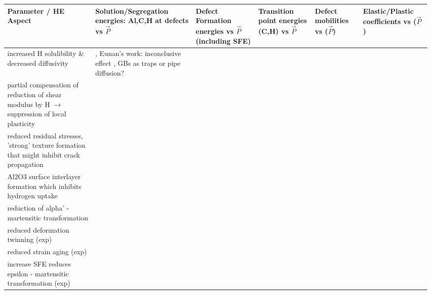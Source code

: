\documentclass[11pt,floatfix,showpacs]{amsart}
\begin{document}
\begin{landscape}
\renewcommand{\arraystretch}{2}

  \begin{tabular}{ ||p{5 cm}|  p{3.3 cm}| p{3 cm}| p{2.5 cm} | p{2.5 cm} | p{3.0 cm} || } %
    \hline
    Parameter / HE Aspect &  Solution/Segregation energies: Al,C,H at defects vs $\vec{P}$ & Defect Formation energies vs $\vec{P} $(including SFE)  & Transition point energies (C,H) vs $\vec{P}$ & Defect mobilities vs ($\vec{P}$) & Elastic/Plastic coefficients vs ($\vec{P}$) \\ \hline
    increased H solulibility \& decreased diffusivity & \cite{song2014interaction,han2015effect,huter2016effects}, {\color{green}Eunan's work: inconclusive effect} {\color{green}\cite{ismer2010ab}}, GBs as traps or pipe diffusion? &  & \cite{huter2016effects} &  \\ \hline
    partial compensation of reduction of shear modulus by H $\to$ suppression of local plasticity   & \cite{han2014hydrogen} &  &  & \cite{han2014hydrogen} & \cite{han2014hydrogen}   \\ \hline 
    reduced residual stresses, ’strong’ texture formation that might
inhibit crack propagation   &  &  &   &  & \cite{chun2012delayed} \\ \hline
    Al2O3 surface interlayer formation which inhibits hydrogen
uptake &  & \cite{park2012mechanism} &   &   & \\ \hline
   reduction of alpha’ - martensitic transformation &  & \cite{kim2008effects,chen1993effect} &   &   & \\ \hline
    reduced deformation twinning (exp) &  & \cite{park2010stacking,jin2012effects}  &   &   & \\ \hline
    reduced strain aging (exp) &  & \cite{koyama2013effects,lee2011origin,shun1992study} &   &   & \\ \hline
   increase SFE reduces epsilon - martensitic transformation
(exp) &  &  \cite{kim2008effects} &   &   & \\ \hline
    

    
  \end{tabular}
\end{landscape}
\end{document}
